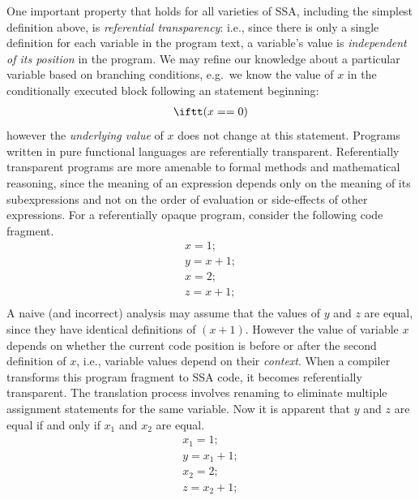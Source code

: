 
One important property that holds for all varieties of SSA,
including the simplest definition above, is 
\emph{referential transparency}: i.e.,
since there is only a single definition for each variable
in the program text, a variable's value
is \textit{independent of
its position} in the program.
We may refine our knowledge about a particular variable
based on branching conditions, e.g.\ we know the value of $x$ in the
conditionally executed block following an \iftt statement beginning:
\begin{equation*}
\begin{array}{l}
\iftt (x==0)
\end{array}
\end{equation*}
however the
\textit{underlying value} of $x$
does not change at this \iftt statement.
Programs written in pure functional languages
are referentially transparent.
%
Referentially transparent programs are more amenable to 
formal methods and mathematical reasoning, since
the meaning of an expression depends only on the
meaning of its subexpressions
and not on the order of evaluation or
side-effects of other expressions.
%
For a referentially opaque program, consider
the following code fragment.
\begin{equation*}
\begin{array}{l}
x = 1;\\
y = x + 1;\\
x = 2;\\
z = x + 1;\\
\end{array}
\end{equation*}
A naive (and incorrect) analysis may assume that the values
of $y$ and $z$ are equal, since they have identical 
definitions of $(x+1)$. 
However the value of variable $x$ depends on whether
the current code position is before or after the second definition
of $x$, i.e., variable values depend on their \textit{context}.
%
When a compiler transforms this program fragment to SSA code,
it becomes referentially transparent. The translation process
involves renaming to  
eliminate multiple assignment statements for the same variable.
Now it is
apparent that $y$ and $z$ are equal if and only if $x_1$ and $x_2$
are equal.
\begin{equation*}
\begin{array}{l}
x_1 = 1;\\
y  = x_1 + 1;\\
x_2 = 2;\\
z  = x_2 + 1;
\end{array}
\end{equation*}

